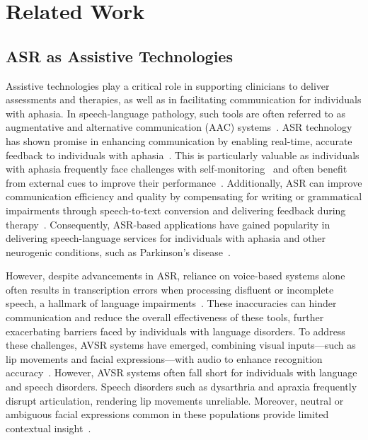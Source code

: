 \section{Related Work}

\subsection{ASR as Assistive Technologies}
Assistive technologies play a critical role in supporting clinicians to deliver assessments and therapies, as well as in facilitating communication for individuals with aphasia. In speech-language pathology, such tools are often referred to as augmentative and alternative communication (AAC) systems~\cite{beukelman1998augmentative}. ASR technology has shown promise in enhancing communication by enabling real-time, accurate feedback to individuals with aphasia~\cite{ballard2019feasibility,barbera2021nuva}. This is particularly valuable as individuals with aphasia frequently face challenges with self-monitoring~\cite{oomen2001prearticulatory,sampson2011investigation} and often benefit from external cues to improve their performance~\cite{tompkins2006communicative,conroy2009effects,schwartz2016does}. Additionally, ASR can improve communication efficiency and quality by compensating for writing or grammatical impairments through speech-to-text conversion and delivering feedback during therapy~\cite{ballard2019feasibility,barbera2021nuva}. Consequently, ASR-based applications have gained popularity in delivering speech-language services for individuals with aphasia and other neurogenic conditions, such as Parkinson’s disease~\cite{hoover2014integrating,mccrocklin2016pronunciation,strik2009comparing}.

However, despite advancements in ASR, reliance on voice-based systems alone often results in transcription errors when processing disfluent or incomplete speech, a hallmark of language impairments~\cite{jefferson2019usability,le2016automatic}. These inaccuracies can hinder communication and reduce the overall effectiveness of these tools, further exacerbating barriers faced by individuals with language disorders. To address these challenges, AVSR systems have emerged, combining visual inputs—such as lip movements and facial expressions—with audio to enhance recognition accuracy~\cite{gabeur2022avatar,afouras2018deep,dupont2000audio,ma2021end,noda2015audio,mroueh2015deep,feng2017audio}. However, AVSR systems often fall short for individuals with language and speech disorders. Speech disorders such as dysarthria and apraxia frequently disrupt articulation, rendering lip movements unreliable. Moreover, neutral or ambiguous facial expressions common in these populations provide limited contextual insight~\cite{tong2020automatic,salama2014audio}.


